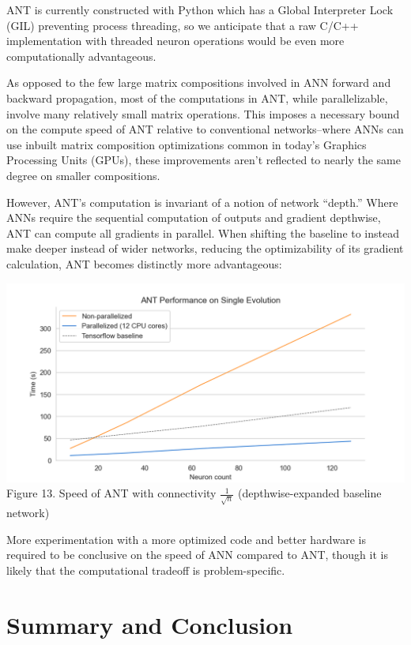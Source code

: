 \documentclass{article}
\begin{document}
\begin{multicols}{2}
	
	ANT is currently constructed with Python which has a Global Interpreter Lock (GIL) preventing process threading, so we anticipate that a raw C/C++ implementation with threaded neuron operations would be even more computationally advantageous.
	
	As opposed to the few large matrix compositions involved in ANN forward and backward propagation, most of the computations in ANT, while parallelizable, involve many relatively small matrix operations. This imposes a necessary bound on the compute speed of ANT relative to conventional networks--where ANNs can use inbuilt matrix composition optimizations common in today's Graphics Processing Units (GPUs), these improvements aren't reflected to nearly the same degree on smaller compositions. 
	
	However, ANT's computation is invariant of a notion of network ``depth.'' Where ANNs require the sequential computation of outputs and gradient depthwise, ANT can compute all gradients in parallel. When shifting the baseline to instead make deeper instead of wider networks, reducing the optimizability of its gradient calculation, ANT becomes distinctly more advantageous:
	
	\begin{center}
		\includegraphics[scale=0.47]{figs/ant_performance_3.png}
		\small Figure 13. Speed of ANT with connectivity $\frac{1}{\sqrt{n}}$ (depthwise-expanded baseline network)
	\end{center}
	
	More experimentation with a more optimized code and better hardware is required to be conclusive on the speed of ANN compared to ANT, though it is likely that the computational tradeoff is problem-specific.
	
	\section{Summary and Conclusion}
	

\end{multicols}
\end{document}
